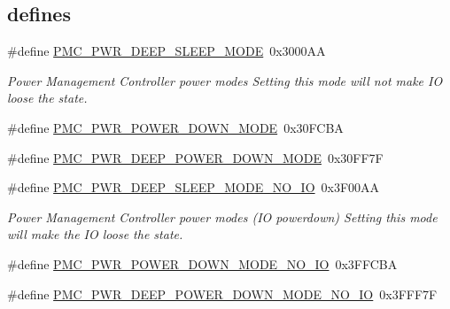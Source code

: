 \subsection*{\textquotesingle{}defines\textquotesingle{}}
\begin{DoxyCompactItemize}
\item 
\#define \hyperlink{group___p_m_c__18_x_x__43_x_x_gaca8a69edb54ddb4cb539fda3f7c123a9}{P\+M\+C\+\_\+\+P\+W\+R\+\_\+\+D\+E\+E\+P\+\_\+\+S\+L\+E\+E\+P\+\_\+\+M\+O\+DE}~0x3000\+AA
\begin{DoxyCompactList}\small\item\em Power Management Controller power modes Setting this mode will not make IO loose the state. \end{DoxyCompactList}\item 
\#define \hyperlink{group___p_m_c__18_x_x__43_x_x_ga488f9a7733cd97457b4656670c7e932b}{P\+M\+C\+\_\+\+P\+W\+R\+\_\+\+P\+O\+W\+E\+R\+\_\+\+D\+O\+W\+N\+\_\+\+M\+O\+DE}~0x30\+F\+C\+BA
\item 
\#define \hyperlink{group___p_m_c__18_x_x__43_x_x_gad8936084d3b16e9bcd783586fc29ee15}{P\+M\+C\+\_\+\+P\+W\+R\+\_\+\+D\+E\+E\+P\+\_\+\+P\+O\+W\+E\+R\+\_\+\+D\+O\+W\+N\+\_\+\+M\+O\+DE}~0x30\+F\+F7F
\item 
\#define \hyperlink{group___p_m_c__18_x_x__43_x_x_ga3696589b9d3f6ab6bb5bee7e44fcde76}{P\+M\+C\+\_\+\+P\+W\+R\+\_\+\+D\+E\+E\+P\+\_\+\+S\+L\+E\+E\+P\+\_\+\+M\+O\+D\+E\+\_\+\+N\+O\+\_\+\+IO}~0x3\+F00\+AA
\begin{DoxyCompactList}\small\item\em Power Management Controller power modes (IO powerdown) Setting this mode will make the IO loose the state. \end{DoxyCompactList}\item 
\#define \hyperlink{group___p_m_c__18_x_x__43_x_x_ga50fdb688d7fbcdad20437595b897973b}{P\+M\+C\+\_\+\+P\+W\+R\+\_\+\+P\+O\+W\+E\+R\+\_\+\+D\+O\+W\+N\+\_\+\+M\+O\+D\+E\+\_\+\+N\+O\+\_\+\+IO}~0x3\+F\+F\+C\+BA
\item 
\#define \hyperlink{group___p_m_c__18_x_x__43_x_x_ga7136b2163bb95b08d538817081f7dd49}{P\+M\+C\+\_\+\+P\+W\+R\+\_\+\+D\+E\+E\+P\+\_\+\+P\+O\+W\+E\+R\+\_\+\+D\+O\+W\+N\+\_\+\+M\+O\+D\+E\+\_\+\+N\+O\+\_\+\+IO}~0x3\+F\+F\+F7F
\end{DoxyCompactItemize}
